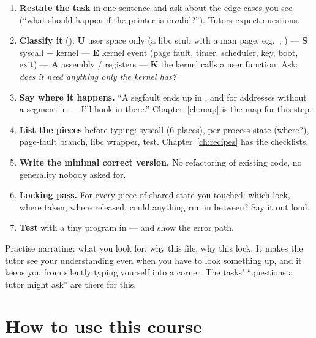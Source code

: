 \begin{enumerate}
\item \textbf{Restate the task} in one sentence and ask about the edge cases you see
  (``what should happen if the pointer is invalid?''). Tutors expect questions.
\item \textbf{Classify it} (): \textbf{U} user space only (a libc stub with a man
  page, e.g.\ , ) --- \textbf{S} syscall + kernel --- \textbf{E} kernel event
  (page fault, timer, scheduler, key, boot, exit) --- \textbf{A} assembly / registers ---
  \textbf{K} the kernel calls a user function. Ask: \emph{does it need anything only the kernel has?}
\item \textbf{Say where it happens.} ``A segfault ends up in
  , and for addresses without a segment in
   --- I'll hook in there.'' Chapter~\ref{ch:map} is the map for this step.
\item \textbf{List the pieces} before typing: syscall (6 places), per-process state (where?),
  page-fault branch, libc wrapper, test. Chapter~\ref{ch:recipes} has the checklists.
\item \textbf{Write the minimal correct version.} No refactoring of existing code, no
  generality nobody asked for.
\item \textbf{Locking pass.} For every piece of shared state you touched: which lock, where
  taken, where released, could anything run in between? Say it out loud.
\item \textbf{Test} with a tiny program in  --- and show the error path.
\end{enumerate}

\begin{infobox}[title=\textbf{Talking while coding}]
Practise narrating: what you look for, why this file, why this lock. It makes the tutor
see your understanding even when you have to look something up, and it keeps you from
silently typing yourself into a corner. The tasks' ``questions a tutor might ask'' are
there for this.
\end{infobox}

\section{How to use this course}


